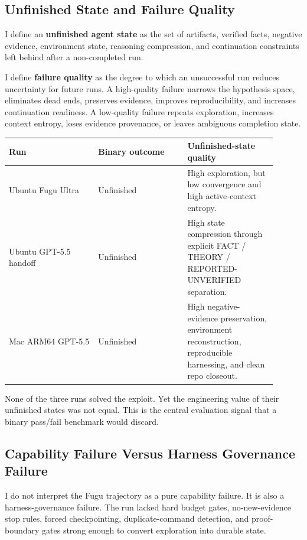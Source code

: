 \documentclass[a4paper,11pt]{article}
\newcommand{\finding}[1]{\textbf{#1}}
\begin{document}
\subsection{Unfinished State and Failure Quality}

I define an \finding{unfinished agent state} as the set of artifacts, verified facts, negative evidence, environment state, reasoning compression, and continuation constraints left behind after a non-completed run.

I define \finding{failure quality} as the degree to which an unsuccessful run reduces uncertainty for future runs. A high-quality failure narrows the hypothesis space, eliminates dead ends, preserves evidence, improves reproducibility, and increases continuation readiness. A low-quality failure repeats exploration, increases context entropy, loses evidence provenance, or leaves ambiguous completion state.

\begin{longtable}{L{0.30\linewidth} L{0.30\linewidth} L{0.30\linewidth}}
\toprule
Run & Binary outcome & Unfinished-state quality\\
\midrule
Ubuntu Fugu Ultra & Unfinished & High exploration, but low convergence and high active-context entropy.\\
Ubuntu GPT-5.5 handoff & Unfinished & High state compression through explicit FACT / THEORY / REPORTED-UNVERIFIED separation.\\
Mac ARM64 GPT-5.5 & Unfinished & High negative-evidence preservation, environment reconstruction, reproducible harnessing, and clean repo closeout.\\
\bottomrule
\end{longtable}

None of the three runs solved the exploit. Yet the engineering value of their unfinished states was not equal. This is the central evaluation signal that a binary pass/fail benchmark would discard.

\subsection{Capability Failure Versus Harness Governance Failure}

I do not interpret the Fugu trajectory as a pure capability failure. It is also a harness-governance failure. The run lacked hard budget gates, no-new-evidence stop rules, forced checkpointing, duplicate-command detection, and proof-boundary gates strong enough to convert exploration into durable state.
\end{document}
